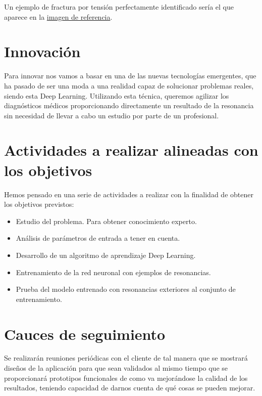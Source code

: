 Un ejemplo de fractura por tensión perfectamente identificado sería el que aparece en la \href{https://www.google.es/search?q=resonancia+magnetica+con+fractura&source=lnms&tbm=isch&sa=X&ved=0ahUKEwj_ydaisK7eAhVDgRoKHeGoDsUQ_AUIDigB&biw=1536&bih=754#imgrc=5wcLStUv22LjAM:}{imagen de referencia}.

\section{Innovación}

Para innovar nos vamos a basar en una de las nuevas tecnologías emergentes, que ha pasado de ser una moda a una realidad capaz de solucionar problemas reales, siendo esta Deep Learning. Utilizando esta técnica, queremos agilizar los diagnósticos médicos proporcionando directamente un resultado de la resonancia sin necesidad de llevar a cabo un estudio por parte de un profesional.

\section{Actividades a realizar alineadas con los objetivos}

Hemos pensado en una serie de actividades a realizar con la finalidad de obtener los objetivos previstos:

\begin{itemize}
	\item Estudio del problema. Para obtener conocimiento experto.
	\item Análisis de parámetros de entrada a tener en cuenta.
	\item Desarrollo de un algoritmo de aprendizaje Deep Learning.
	\item Entrenamiento de la red neuronal con ejemplos de resonancias.
	\item Prueba del modelo entrenado con resonancias exteriores al conjunto de entrenamiento.
\end{itemize}

\section{Cauces de seguimiento}

Se realizarán reuniones periódicas con el cliente de tal manera que se mostrará diseños de la aplicación para que sean validados al mismo tiempo que se proporcionará prototipos funcionales de como va mejorándose la calidad de los resultados, teniendo capacidad de darnos cuenta de qué cosas se pueden mejorar.

